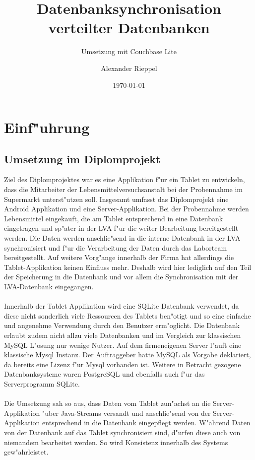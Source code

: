 \documentclass[a4paper,14pt]{scrreprt}
\begin{document}
\author{Alexander Rieppel} %
\title{Datenbanksynchronisation verteilter Datenbanken} %
\subject{VSDB} %
\subtitle{Umsetzung mit Couchbase Lite} %
\date{\today} %
\publishers{5AHITT} %

\maketitle
\tableofcontents
 

\chapter{Einf"uhrung}
\section{Umsetzung im Diplomprojekt}
Ziel des Diplomprojektes war es eine Applikation f"ur ein Tablet zu entwickeln, dass die Mitarbeiter der Lebensmittelversuchsanstalt bei der Probennahme im Supermarkt unterst"utzen soll. Insgesamt umfasst das Diplomprojekt eine Android Applikation und eine Server-Applikation. Bei der Probennahme werden Lebensmittel eingekauft, die am Tablet entsprechend in eine Datenbank eingetragen und sp"ater in der LVA f"ur die weiter Bearbeitung bereitgestellt werden. Die Daten werden anschlie"send in die interne Datenbank in der LVA synchronisiert und f"ur die Verarbeitung der Daten durch das Laborteam bereitgestellt. Auf weitere Vorg"ange innerhalb der Firma hat allerdings die Tablet-Applikation keinen Einfluss mehr. Deshalb wird hier lediglich auf den Teil der Speicherung in die Datenbank und vor allem die Synchronisation mit der LVA-Datenbank eingegangen. \\\\Innerhalb der Tablet Applikation wird eine SQLite Datenbank verwendet, da diese nicht sonderlich viele Ressourcen des Tablets ben"otigt und so eine einfache und angenehme Verwendung durch den Benutzer erm"oglicht. Die Datenbank erlaubt zudem nicht allzu viele Datenbanken und im Vergleich zur klassischen MySQL L"osung nur wenige Nutzer. Auf dem firmeneigenen Server l"auft eine klassische Mysql Instanz. Der Auftraggeber hatte MySQL als Vorgabe deklariert, da bereits eine Lizenz f"ur Mysql vorhanden ist. Weitere in Betracht gezogene Datenbanksysteme waren PostgreSQL und ebenfalls auch f"ur das Serverprogramm SQLite. \\\\ Die Umsetzung sah so aus, dass Daten vom Tablet zun"achst an die Server-Applikation "uber Java-Streams versandt und anschlie"send von der Server-Applikation entsprechend in die Datenbank eingepflegt werden. W"ahrend Daten von der Datenbank auf das Tablet synchronisiert sind, d"urfen diese auch von niemandem bearbeitet werden. So wird Konsistenz innerhalb des Systems gew"ahrleistet.\cite{diploMeins}
\end{document}
